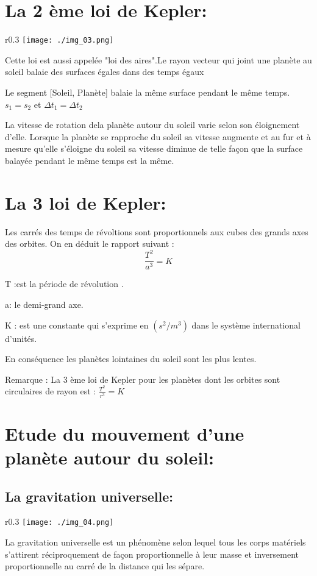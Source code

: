 \documentclass[12pt]{article}
\begin{document}
\section*{La 2 ème loi de Kepler:}
\begin{wrapfigure}{r}{0.3\textwidth}
	\vspace{-2cm}
	\texttt{[image: ./img\_03.png]}
\end{wrapfigure}
Cette loi est aussi appelée "loi des aires".Le rayon vecteur qui joint une planète au soleil balaie des surfaces égales dans des temps égaux

Le segment [Soleil, Planète] balaie la même surface pendant le même temps.
$s_1 = s_2$ et $\Delta{t_1} = \Delta{t_2}$

La vitesse de rotation dela planète autour du soleil varie selon son éloignement d'elle.
Lorsque la planète se rapproche du soleil sa vitesse augmente et au fur et à mesure qu'elle s'éloigne du soleil sa
vitesse diminue de telle façon que la surface balayée pendant le même temps est la même.


\section*{La 3 loi de Kepler:}
Les carrés des temps de révoltions sont proportionnels aux cubes des grands axes des orbites. On en déduit le rapport suivant :$$\frac{T^2}{a^3} = K$$

T :est la période de révolution .

a: le demi-grand axe.

K : est une constante qui s'exprime en $(s^2/m^3)$ dans le système international d'unités.

En conséquence les planètes lointaines du soleil sont les plus lentes.
\begin{tcolorbox}
Remarque : La 3
ème loi de Kepler pour les planètes dont les orbites sont circulaires de rayon est : $\frac{T^2}{r^3} = K$

\end{tcolorbox}

\section{Etude du mouvement d’une planète autour du soleil: }

\subsection{La gravitation universelle: }
\begin{wrapfigure}{r}{0.3\textwidth}
	\vspace{-2cm}
	\texttt{[image: ./img\_04.png]}
\end{wrapfigure}
La gravitation universelle est un phénomène selon lequel tous les corps matériels s'attirent réciproquement de façon
proportionnelle à leur masse et inversement proportionnelle au carré de la distance qui les sépare.
\end{document}
